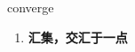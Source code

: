 
\begin{frame}
{\huge converge}
\begin{center}
\begin{enumerate}\Large
  \item \textbf{汇集，交汇于一点}
\end{enumerate}
\end{center}
\end{frame}
